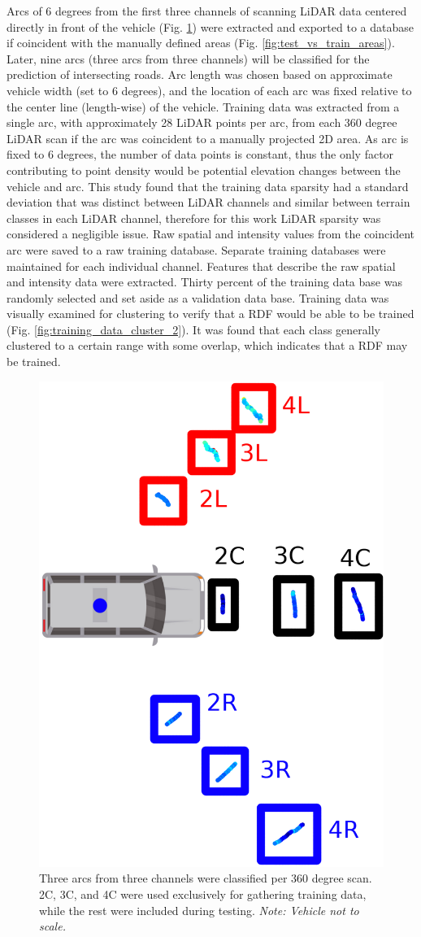 \documentclass[journal,onecolumn]{IEEEtran}
\begin{document}
			{Arcs of 6 degrees from the first three channels of scanning LiDAR data centered directly in front of the vehicle (Fig. \ref{fig:area_example}) were extracted and exported to a database if coincident with the manually defined areas (Fig. \ref{fig:test_vs_train_areas}). Later, nine arcs (three arcs from three channels) will be classified for the prediction of intersecting roads. Arc length was chosen based on approximate vehicle width (set to 6 degrees), and the location of each arc was fixed relative to the center line (length-wise) of the vehicle. Training data was extracted from a single arc, with approximately 28 LiDAR points per arc, from each 360 degree LiDAR scan if the arc was coincident to a manually projected 2D area. As arc is fixed to 6 degrees, the number of data points is constant, thus the only factor contributing to point density would be potential elevation changes between the vehicle and arc. This study found that the training data sparsity had a standard deviation that was distinct between LiDAR channels and similar between terrain classes in each LiDAR channel, therefore for this work LiDAR sparsity was considered a negligible issue. Raw spatial and intensity values from the coincident arc were saved to a raw training database. Separate training databases were maintained for each individual channel. Features that describe the raw spatial and intensity data were extracted. Thirty percent of the training data base was randomly selected and set aside as a validation data base. Training data was visually examined for clustering to verify that a RDF would be able to be trained (Fig. \ref{fig:training_data_cluster_2}). It was found that each class generally clustered to a certain range with some overlap, which indicates that a RDF may be trained. }
			
			\begin{figure}[H]
				\centering
				\includegraphics[width=0.25\linewidth]{figures/nine_arcs_example}
				\caption[Areas to Classify]{Three arcs from three channels were classified per 360 degree scan. 2C, 3C, and 4C were used exclusively for gathering training data, while the rest were included during testing. \textit{Note: Vehicle not to scale.}}
				\label{fig:area_example}
			\end{figure}
		
\end{document}
